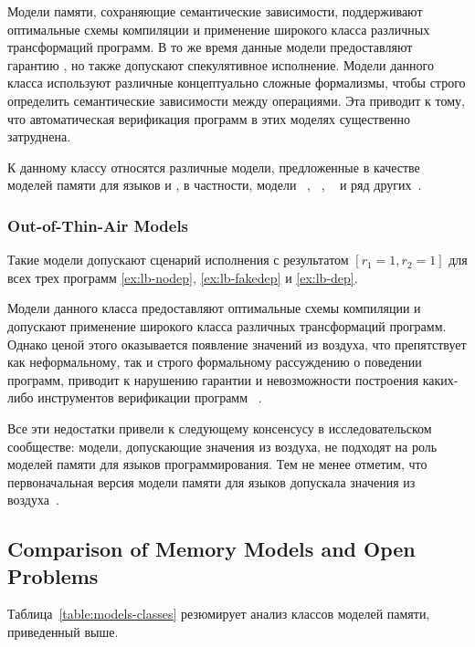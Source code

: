 Модели памяти, сохраняющие семантические зависимости,
поддерживают оптимальные схемы компиляции и
применение широкого класса различных трансформаций программ.
В то же время данные модели предоставляют гарантию \DRF,
но также допускают спекулятивное исполнение.
Модели данного класса используют различные
концептуально сложные формализмы, чтобы  строго определить  семантические зависимости между операциями.
Эта приводит к тому,
что автоматическая верификация программ в этих моделях существенно затруднена.

К данному классу относятся различные модели,
предложенные в качестве моделей памяти для
языков \CPP и \Java, в частности, модели
\Prm~\cite{Kang-al:POPL17},
\Wkm~\cite{Chakraborty-Vafeiadis:POPL19}, 
\PwP~\cite{Jagadeesan-al:OOPSLA2020}
и ряд других~\cite{Jeffrey-Riely:LICS16,PichonPharabod-Sewell:POPL16,Paviotti-al:ESOP20}.

\subsubsection*{Out-of-Thin-Air Models}

Такие модели допускают сценарий исполнения с результатом ${[r_1=1,r_2=1]}$
для всех трех программ \ref{ex:lb-nodep}, \ref{ex:lb-fakedep} и \ref{ex:lb-dep}.

Модели данного класса предоставляют оптимальные схемы компиляции и
допускают применение широкого класса различных трансформаций программ.
Однако ценой этого оказывается появление значений из воздуха, что препятствует как неформальному,
так и строго формальному рассуждению о поведении программ,
приводит к нарушению гарантии \DRF и невозможности
построения каких-либо инструментов верификации программ%
~\cite{Boehm-Demsky:MSPC14, Batty-al:ESOP15}. 

Все эти недостатки 
привели к следующему консенсусу в исследовательском сообществе:
модели, допускающие значения из воздуха,
не подходят на роль моделей памяти 
для языков программирования.
Тем не менее отметим, что первоначальная версия модели памяти для языков \CPP
допускала значения из воздуха~\cite{Batty-al:POPL11}.

\subsection{Comparison of Memory Models and Open Problems}
\label{sec:models-summary}

Таблица~\ref{table:models-classes} резюмирует 
анализ классов моделей памяти, приведенный выше.

